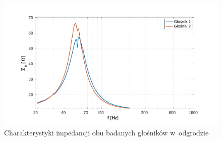 \documentclass[12pt]{oska}
\begin{document}
		\begin{figure}[H]
			\centering
			\includegraphics[width=.8\textwidth,trim={2cm .5cm 2cm 1cm},clip]{porownanie_glosnikow.pdf}
			\caption{Charakterystyki impedancji obu badanych głośników w~odgrodzie}
			\label{r:2glosniki}
		\end{figure}
		
\end{document}
